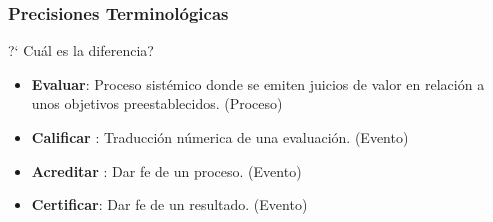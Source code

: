 \documentclass{beamer}
\begin{document}
\begin{frame}
\frametitle{Precisiones Terminol\'ogicas}
\begin{block}{?` Cu\'al es la diferencia? }
\begin{itemize}
\item \textbf{Evaluar}: Proceso sist\'emico donde se emiten juicios de valor en relaci\'on a unos objetivos preestablecidos. (Proceso)
\item \textbf{Calificar} : Traducci\'on n\'umerica de una evaluaci\'on. (Evento)
\item \textbf{Acreditar} : Dar fe de un proceso. (Evento)
\item \textbf{Certificar}: Dar fe de un resultado. (Evento)
\end{itemize}
\end{block}
\end{frame}
\end{document}
